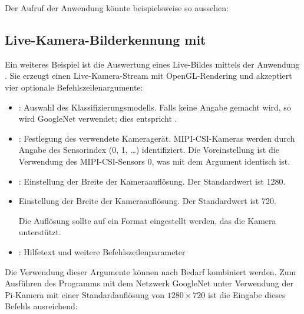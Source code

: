 \medskip
 
Der Aufruf der Anwendung könnte beispielsweise so aussehen:

\medskip




\subsection{Live-Kamera-Bilderkennung mit }

Ein weiteres Beispiel ist die Auswertung eines Live-Bildes mittels der Anwendung . Sie erzeugt einen Live-Kamera-Stream mit OpenGL-Rendering und akzeptiert vier optionale Befehlszeilenargumente: 

\begin{itemize}
  \item [] : Auswahl des Klassifizierungsmodells. Falls keine Angabe gemacht wird, so wird GoogleNet verwendet; dies entspricht .
  \item [] : Festlegung des verwendete Kameragerät. MIPI-CSI-Kameras werden durch Angabe des Sensorindex (0, 1, \ldots) identifiziert. Die Voreinstellung ist die Verwendung des MIPI-CSI-Sensors 0, was mit dem Argument  identisch ist.
  \item [] : Einstellung der Breite der Kameraauflösung. Der Standardwert ist 1280.
  \item []  Einstellung der Breite der Kameraauflösung. Der Standardwert ist 720.
  
           Die Auflösung sollte auf ein Format eingestellt werden, das die Kamera unterstützt.
  \item []  : Hilfetext und weitere Befehlszeilenparameter
\end{itemize}



Die Verwendung dieser Argumente können nach Bedarf kombiniert werden. Zum Ausführen des Programms mit dem Netzwerk GoogleNet unter Verwendung der Pi-Kamera mit einer Standardauflösung von $1280 \times 720$ ist die Eingabe dieses Befehls ausreichend:

\medskip

